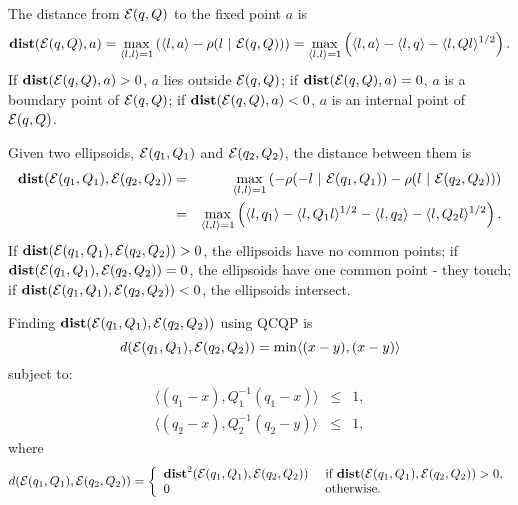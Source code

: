 The distance from $\EE(q,Q)$ to the fixed point $a$ is
\begin{equation}
{\bf dist}(\EE(q,Q),a) = \max_{\langle l,l\rangle=1}\left(\langle l,a\rangle -
\rho(l ~|~ \EE(q,Q)) \right) =
\max_{\langle l,l\rangle=1}\left(\langle l,a\rangle - \langle l,q\rangle -
\langle l,Ql\rangle^{1/2}\right). \label{dist_point}
\end{equation}
If ${\bf dist}(\EE(q,Q),a) > 0$, $a$ lies outside  $\EE(q,Q)$;
if ${\bf dist}(\EE(q,Q),a) = 0$, $a$ is a boundary point of $\EE(q,Q)$;
if ${\bf dist}(\EE(q,Q),a) < 0$, $a$ is an internal point of $\EE(q,Q)$.

Given two ellipsoids, $\EE(q_1,Q_1)$ and $\EE(q_2,Q_2)$, the distance between
them is
\begin{eqnarray}
{\bf dist}(\EE(q_1,Q_1),\EE(q_2,Q_2)) & = & \max_{\langle l,l\rangle=1}
\left(-\rho(-l ~|~ \EE(q_1,Q_1)) - \rho(l ~|~ \EE(q_2,Q_2))\right) \\
& = & \max_{\langle l,l\rangle=1}\left(\langle l,q_1\rangle -
\langle l,Q_1l\rangle^{1/2} - \langle l,q_2\rangle -
\langle l,Q_2l\rangle^{1/2}\right). \label{dist_ell}
\end{eqnarray}
If ${\bf dist}(\EE(q_1,Q_1),\EE(q_2,Q_2)) > 0$,  the ellipsoids have no
common points;
if ${\bf dist}(\EE(q_1,Q_1),\EE(q_2,Q_2)) = 0$,  the ellipsoids have one
common point - they touch;
if ${\bf dist}(\EE(q_1,Q_1),\EE(q_2,Q_2)) < 0$,  the ellipsoids intersect.

Finding ${\bf dist}(\EE(q_1,Q_1),\EE(q_2,Q_2))$ using QCQP is
\[ d(\EE(q_1,Q_1),\EE(q_2,Q_2)) = \min \langle (x-y), (x-y)\rangle \]
subject to:
\begin{eqnarray*}
\langle (q_1-x), Q_1^{-1}(q_1-x)\rangle & \leq & 1,\\
\langle (q_2-x), Q_2^{-1}(q_2-y)\rangle & \leq & 1,
\end{eqnarray*}
where
\[ d(\EE(q_1,Q_1),\EE(q_2,Q_2))=\left\{\begin{array}{ll}
{\bf dist}^2(\EE(q_1,Q_1),\EE(q_2,Q_2)) &
\mbox{ if } {\bf dist}(\EE(q_1,Q_1),\EE(q_2,Q_2))>0, \\
0 & \mbox{ otherwise}. \end{array}\right. \]


